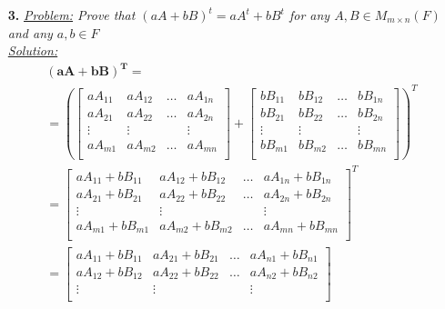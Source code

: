 \documentclass[11pt, fleqn]{article}
\begin{document}
\begin{itemize}
    \item [\textbf{3.}]\textit{\underline{Problem:} Prove that $(aA + bB)^t = aA^t + bB^t$ for any $A,B \in M_{m\times n}(F)$ and any $a,b \in F$}\\[2ex]\textit{\underline{Solution:}}\allowdisplaybreaks
    	\begin{align*}
    			&\mathbf{(aA + bB)^T =}\\
	            &=\left(\begin{bmatrix}
	                aA_{11} & aA_{12} & \hdots & aA_{1n}\\
	                aA_{21} & aA_{22} & \hdots & aA_{2n}\\
	                \vdots & \vdots &  & \vdots\\
	                aA_{m1} & aA_{m2} & \hdots & aA_{mn}\\
	                \nonumber
	            \end{bmatrix} +
	            \begin{bmatrix}
	                bB_{11} & bB_{12} & \hdots & bB_{1n}\\
	                bB_{21} & bB_{22} & \hdots & bB_{2n}\\
	                \vdots & \vdots &  & \vdots\\
	                bB_{m1} & bB_{m2} & \hdots & bB_{mn}\\
	                \nonumber
	            \end{bmatrix}\right)^T\\
	            &=\begin{bmatrix}
	                aA_{11} + bB_{11} & aA_{12} + bB_{12} & \hdots & aA_{1n} + bB_{1n}\\
	                aA_{21} + bB_{21} & aA_{22} + bB_{22} & \hdots &  aA_{2n} + bB_{2n}\\
	                \vdots & \vdots &  & \vdots\\
	                aA_{m1} + bB_{m1} & aA_{m2} + bB_{m2} & \hdots & aA_{mn} + bB_{mn}\\
	                \nonumber
	            \end{bmatrix}^T\\
	            &=\begin{bmatrix}
	                aA_{11} + bB_{11} & aA_{21} + bB_{21} & \hdots & aA_{n1} + bB_{n1}\\
	                aA_{12} + bB_{12} & aA_{22} + bB_{22} & \hdots &  aA_{n2} + bB_{n2}\\
	                \vdots & \vdots &  & \vdots\\

\end{bmatrix}
\end{align*}
\end{itemize}
\end{document}
